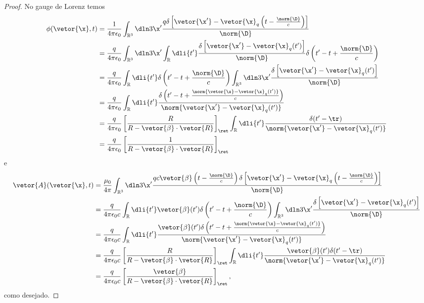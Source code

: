 \begin{proof}
   No gauge de Lorenz temos
   \begin{align*}
      \phi(\vetor{\x}, t) &= \frac{1}{4\pi \epsilon_0}\int_{\mathbb{R}^3} \dln3{\x'} \frac{q\delta\left[\vetor{\x'} - \vetor{\x}_q\left(t - \frac{\norm{\D}}{c}\right)\right]}{\norm{\D}}\\
                          &= \frac{q}{4\pi \epsilon_0}\int_{\mathbb{R}^3} \dln3{\x'} \int_{\mathbb{R}} \dli{t'} \frac{\delta\left[\vetor{\x'} - \vetor{\x}_q(t')\right]}{\norm{\D}} \delta\left(t' - t + \frac{\norm{\D}}{c}\right)\\
                          &= \frac{q}{4\pi \epsilon_0} \int_{\mathbb{R}} \dli{t'} \delta\left(t' - t + \frac{\norm{\D}}{c}\right) \int_{\mathbb{R}^3} \dln3{\x'} \frac{\delta\left[\vetor{\x'} - \vetor{\x}_q(t')\right]}{\norm{\D}}\\
                          &= \frac{q}{4\pi \epsilon_0} \int_{\mathbb{R}} \dli{t'} \frac{\delta\left(t' - t + \frac{\norm{\vetor{\x} - \vetor{\x}_q(t')}}{c}\right)}{\norm{\vetor{\x'} - \vetor{\x}_q(t')}}\\
                          &= \frac{q}{4\pi \epsilon_0} \left[\frac{R}{R - \vetor{\beta} \cdot \vetor{R}}\right]_\ret \int_{\mathbb{R}} \dli{t'} \frac{\delta(t' - \tr)}{\norm{\vetor{\x'} - \vetor{\x}_q(t')}}\\
                          &= \frac{q}{4\pi \epsilon_0} \left[\frac{1}{R - \vetor{\beta} \cdot \vetor{R}}\right]_\ret
   \end{align*}
   e
   \begin{align*}
      \vetor{A}(\vetor{\x}, t) &= \frac{\mu_0}{4\pi}\int_{\mathbb{R}^3} \dln3{\x'} \frac{qc\vetor{\beta}\left(t - \frac{\norm{\D}}{c}\right)\delta\left[\vetor{\x'} - \vetor{\x}_q\left(t - \frac{\norm{\D}}{c}\right)\right]}{\norm{\D}}\\
                               &= \frac{q}{4\pi \epsilon_0 c} \int_{\mathbb{R}} \dli{t'} \vetor{\beta}(t')\delta\left(t' - t + \frac{\norm{\D}}{c}\right) \int_{\mathbb{R}^3} \dln3{\x'} \frac{\delta\left[\vetor{\x'} - \vetor{\x}_q(t')\right]}{\norm{\D}}\\
                               &= \frac{q}{4\pi \epsilon_0 c} \int_{\mathbb{R}} \dli{t'} \frac{\vetor{\beta}(t')\delta\left(t' - t + \frac{\norm{\vetor{\x} - \vetor{\x}_q(t')}}{c}\right)}{\norm{\vetor{\x'} - \vetor{\x}_q(t')}}\\
                               &= \frac{q}{4\pi \epsilon_0 c} \left[\frac{R}{R - \vetor{\beta} \cdot \vetor{R}}\right]_\ret \int_{\mathbb{R}} \dli{t'} \frac{\vetor{\beta}(t')\delta(t' - \tr)}{\norm{\vetor{\x'} - \vetor{\x}_q(t')}}\\
                               &= \frac{q}{4\pi \epsilon_0c} \left[\frac{\vetor{\beta}}{R - \vetor{\beta} \cdot \vetor{R}}\right]_\ret,
\end{align*}
   como desejado.
\end{proof}

